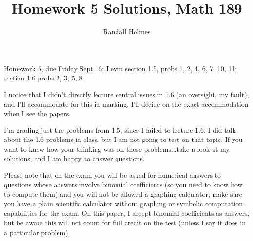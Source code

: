 \documentclass[12pt]{article}
\title{Homework 5 Solutions, Math 189}
\author{Randall Holmes}
\begin{document}
\maketitle

Homework 5, due Friday Sept 16: Levin section 1.5, probs 1, 2, 4, 6, 7, 10, 11; section 1.6 probs 2, 3, 5, 8

I notice that I didn't directly lecture central issues in 1.6 (an oversight, my fault), and I'll accommodate for this in marking.  I'll decide on the exact accommodation when I see the papers.

I'm grading just the problems from 1.5, since I failed to lecture 1.6.  I did talk about the 1.6 problems in class, but I am not going to test on that topic.  If you want to know how your thinking was on those problems...take a look at my solutions, and I am happy to answer questions.

Please note that on the exam you will be asked for numerical answers to questions whose answers involve binomial coefficients (so you need to know how to compute them) and you will not be allowed a graphing calculator;  make sure you have a plain scientific calculator without graphing or symbolic computation capabilities for the exam.  On this paper, I accept binomial coefficients as answers, but be aware this will not count for full credit on the test (unless I say it does in a particular problem).
\end{document}
